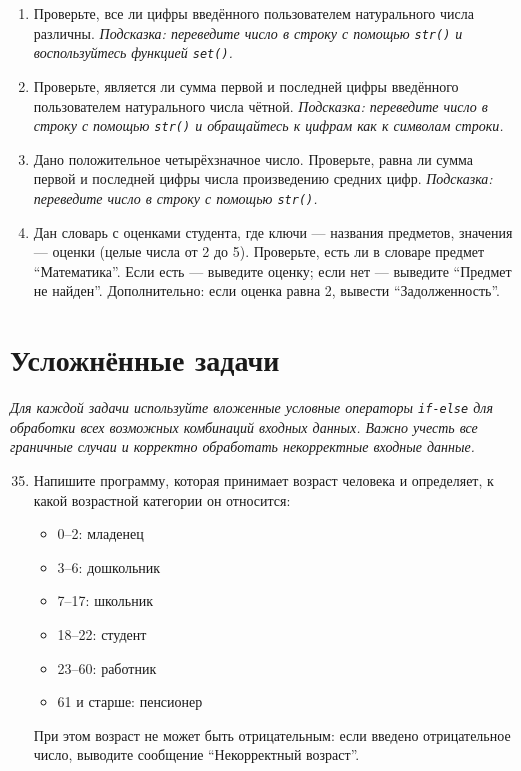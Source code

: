\documentclass[a4paper,12pt]{article}
\theoremstyle{remark}
\begin{document}
\begin{enumerate}
    \item Проверьте, все ли цифры введённого пользователем натурального числа различны.
    \textit{Подсказка: переведите число в строку с помощью \texttt{str()} и воспользуйтесь функцией \texttt{set()}.}

    \item Проверьте, является ли сумма первой и последней цифры введённого пользователем натурального числа чётной.
    \textit{Подсказка: переведите число в строку с помощью \texttt{str()} и обращайтесь к цифрам как к символам строки.}

    \item Дано положительное четырёхзначное число. Проверьте, равна ли сумма первой и последней цифры числа произведению средних цифр.
    \textit{Подсказка: переведите число в строку с помощью \texttt{str()}.}

    \item Дан словарь с оценками студента, где ключи — названия предметов, значения — оценки (целые числа от 2 до 5). Проверьте, есть ли в словаре предмет \enquote{Математика}. Если есть — выведите оценку; если нет — выведите \enquote{Предмет не найден}. Дополнительно: если оценка равна 2, вывести \enquote{Задолженность}.

\end{enumerate}

\section*{\centering Усложнённые задачи}
\textit{Для каждой задачи используйте вложенные условные операторы \texttt{if-else} для обработки всех возможных комбинаций входных данных. Важно учесть все граничные случаи и корректно обработать некорректные входные данные.}

\begin{enumerate}
    \setcounter{enumi}{34}

    \item Напишите программу, которая принимает возраст человека и определяет, к какой возрастной категории он относится:
    \begin{itemize}
        \item 0--2: младенец
        \item 3--6: дошкольник
        \item 7--17: школьник
        \item 18--22: студент
        \item 23--60: работник
        \item 61 и старше: пенсионер
    \end{itemize}
    При этом возраст не может быть отрицательным: если введено отрицательное число, выводите сообщение \enquote{Некорректный возраст}.

\end{enumerate}
\end{document}

